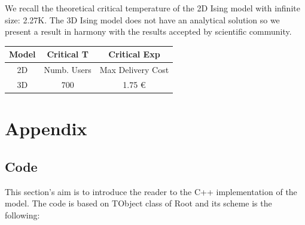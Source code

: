 \documentclass[11pt,a4paper]{article}
\begin{document}
\begin{center}
\end{center}



We recall the theoretical critical temperature of the 2D Ising model with infinite size: 2.27K. The 3D Ising model does not have an analytical solution so we present a result in harmony with the results accepted by scientific community.
\begin{center}
  \begin{tabular}{c|c|c}
 	Model & Critical T & Critical Exp  \\
    \hline    
    \hline
    2D & Numb. Users & Max Delivery Cost \\
    \hline
    \hline
    3D & 700         & 1.75 \euro{}     \\
    \hline
  \end{tabular}
\end{center}


 


\newpage

\section{Appendix}
\subsection*{Code}
This section's aim is to introduce the reader to the C++ implementation of the model. The code is based on TObject class of Root and its scheme is the following:
\end{document}
